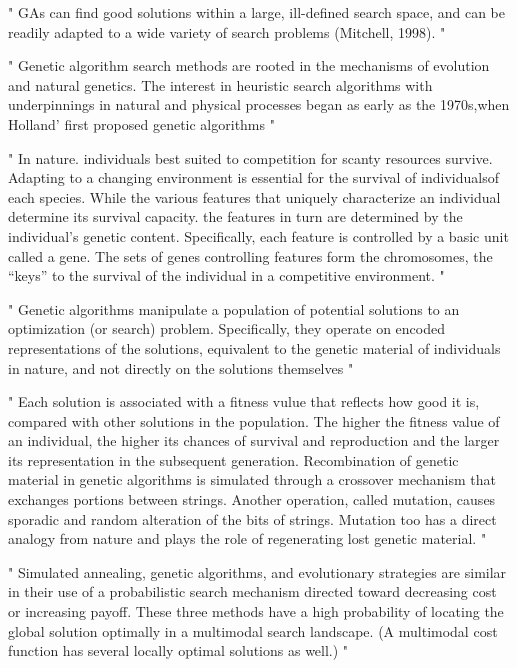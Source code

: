 "
GAs can find good solutions within a large, ill-defined search space, and can be readily adapted to a wide variety of search problems (Mitchell, 1998).
"\cite{mills_determining_2015}

"
Genetic algorithm search methods are rooted in the mechanisms of evolution and natural genetics. The interest in heuristic search algorithms with underpinnings in natural and physical processes began as early as the 1970s,when Holland’ first proposed genetic algorithms
"\cite{srinivas_genetic_1994}


"
In nature. individuals best suited to competition for scanty resources survive. Adapting to a changing environment is essential for the survival of individualsof each species. While the various features that uniquely characterize an individual determine its survival capacity. the features in turn are determined by the individual’s genetic content. Specifically, each feature is controlled by a basic unit called a gene. The sets of genes controlling features form the chromosomes, the “keys” to the survival of the individual in a competitive environment.
"\cite{srinivas_genetic_1994}

"
Genetic algorithms manipulate a population of potential solutions to an optimization (or search) problem. Specifically, they operate on encoded representations of the solutions, equivalent to the genetic material of individuals in nature, and not directly on the solutions themselves
"\cite{srinivas_genetic_1994}

"
Each solution is associated with a fitness vulue that reflects how good it is, compared with other solutions in the population. The higher the fitness value of an individual, the higher its chances of survival and reproduction and the larger its representation in the subsequent generation. Recombination of genetic material in genetic algorithms is simulated through a crossover mechanism that exchanges portions between strings. Another operation, called mutation, causes sporadic and random alteration of the bits of strings. Mutation too has a direct analogy from nature and plays the role of regenerating lost genetic material.
"\cite{srinivas_genetic_1994}


"
Simulated annealing, genetic algorithms, and evolutionary strategies are similar in their use of a probabilistic search mechanism directed toward decreasing cost or increasing payoff. These three methods have a high probability of locating the global solution optimally in a multimodal search landscape. (A multimodal cost function has several locally optimal solutions as well.)
"\cite{srinivas_genetic_1994}

